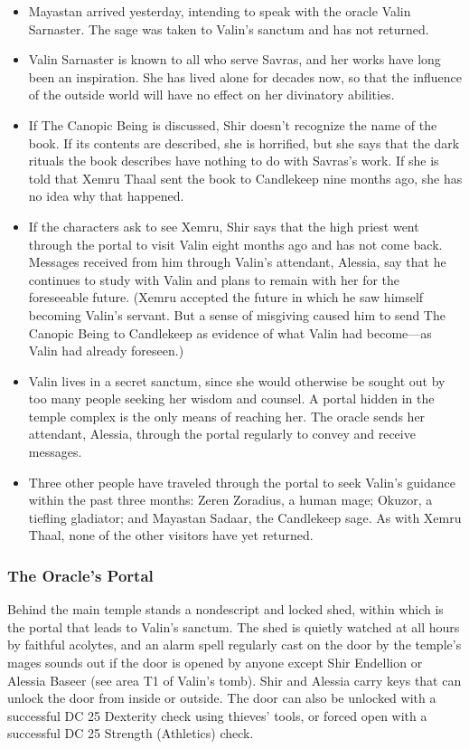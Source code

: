 \documentclass[10pt,a4paper,twoside,bg=print,twocolumn,openany,nodeprecatedcode]{dndbook}
\begin{document}
\begin{itemize}
\item Mayastan arrived yesterday, intending to speak with the oracle Valin Sarnaster. The sage was taken to Valin's sanctum and has not returned.
\item Valin Sarnaster is known to all who serve Savras, and her works have long been an inspiration. She has lived alone for decades now, so that the influence of the outside world will have no effect on her divinatory abilities.
\item If The Canopic Being is discussed, Shir doesn't recognize the name of the book. If its contents are described, she is horrified, but she says that the dark rituals the book describes have nothing to do with Savras's work. If she is told that Xemru Thaal sent the book to Candlekeep nine months ago, she has no idea why that happened.
\item If the characters ask to see Xemru, Shir says that the high priest went through the portal to visit Valin eight months ago and has not come back. Messages received from him through Valin's attendant, Alessia, say that he continues to study with Valin and plans to remain with her for the foreseeable future. (Xemru accepted the future in which he saw himself becoming Valin's servant. But a sense of misgiving caused him to send The Canopic Being to Candlekeep as evidence of what Valin had become—as Valin had already foreseen.)
\item Valin lives in a secret sanctum, since she would otherwise be sought out by too many people seeking her wisdom and counsel. A portal hidden in the temple complex is the only means of reaching her. The oracle sends her attendant, Alessia, through the portal regularly to convey and receive messages.
\item Three other people have traveled through the portal to seek Valin's guidance within the past three months: Zeren Zoradius, a human mage; Okuzor, a tiefling gladiator; and Mayastan Sadaar, the Candlekeep sage. As with Xemru Thaal, none of the other visitors have yet returned.
\end{itemize}

\subsubsection{The Oracle's Portal}
Behind the main temple stands a nondescript and locked shed, within which is the portal that leads to Valin's sanctum. The shed is quietly watched at all hours by faithful acolytes, and an alarm spell regularly cast on the door by the temple's mages sounds out if the door is opened by anyone except Shir Endellion or Alessia Baseer (see area T1 of Valin's tomb). Shir and Alessia carry keys that can unlock the door from inside or outside. The door can also be unlocked with a successful DC 25 Dexterity check using thieves' tools, or forced open with a successful DC 25 Strength (Athletics) check.
\end{document}
